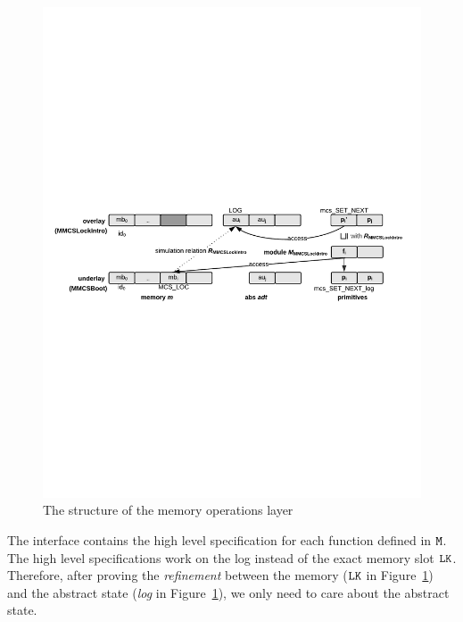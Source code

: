 \begin{figure}
\begin{center}
\includegraphics[width=\linewidth]{figs/mcslock/layer3}
\end{center}
\caption{The structure of the memory operations layer}
\label{fig:chapter:mcslock:layer-struct-mcs-verification}
\end{figure}

The interface  contains the high level specification for each function defined in ${\texttt{M}}$. 
The high level specifications work on the log instead of the exact memory slot ${\mathrm{\texttt{LK}}}$.
Therefore, after proving the {\em refinement} between the memory (${\mathrm{\texttt{LK}}}$ in Figure~\ref{fig:chapter:mcslock:layer-struct-mcs-verification})
and the abstract state (\emph{log} in Figure~\ref{fig:chapter:mcslock:layer-struct-mcs-verification}), we only need to care about the abstract state.

